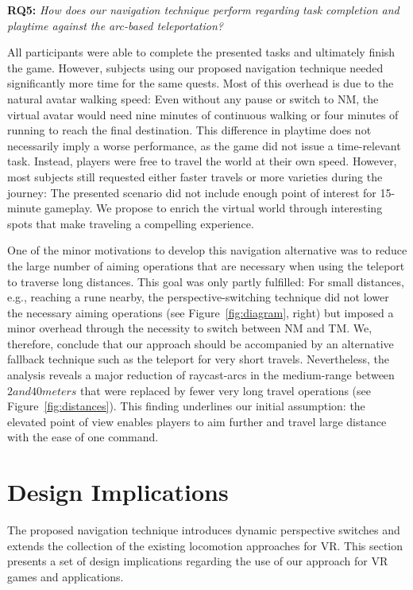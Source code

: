 \documentclass{sigchi}
\begin{document}
\textbf{RQ5:} \textit{How does our navigation technique perform regarding task completion and playtime against the arc-based teleportation?}\par
All participants were able to complete the presented tasks and ultimately finish the game. However, subjects using our proposed navigation technique needed significantly more time for the same quests. Most of this overhead is due to the natural avatar walking speed: Even without any pause or switch to NM, the virtual avatar would need nine minutes of continuous walking or four minutes of running to reach the final destination. This difference in playtime does not necessarily imply a worse performance, as the game did not issue a time-relevant task. Instead, players were free to travel the world at their own speed. However, most subjects still requested either faster travels or more varieties during the journey: The presented scenario did not include enough point of interest for 15-minute gameplay. We propose to enrich the virtual world through interesting spots that make traveling a compelling experience.\par
One of the minor motivations to develop this navigation alternative was to reduce the large number of aiming operations that are necessary when using the teleport to traverse long distances. This goal was only partly fulfilled: For small distances, e.g., reaching a rune nearby, the perspective-switching technique did not lower the necessary aiming operations (see Figure~\ref{fig:diagram}, right) but imposed a minor overhead through the necessity to switch between NM and TM. We, therefore, conclude that our approach should be accompanied by an alternative fallback technique such as the teleport for very short travels. Nevertheless, the analysis reveals a major reduction of raycast-arcs in the medium-range between $2 and 40 meters$ that were replaced by fewer very long travel operations (see Figure~\ref{fig:distances}). This finding underlines our initial assumption: the elevated point of view enables players to aim further and travel large distance with the ease of one command.\par

\section{Design Implications}
The proposed navigation technique introduces dynamic perspective switches and extends the collection of the existing locomotion approaches for VR. This section presents a set of design implications regarding the use of our approach for VR games and applications.
\end{document}
